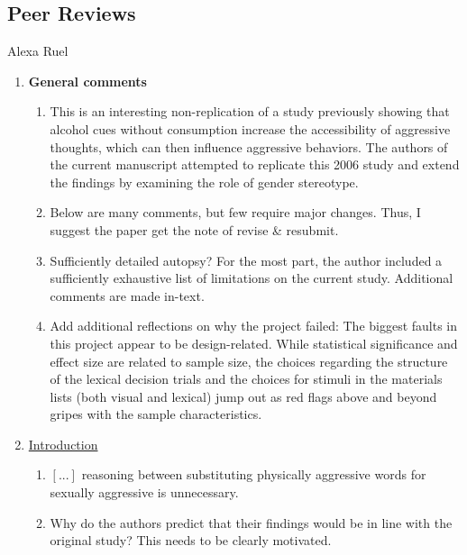\documentclass[authordate, serif, review]{jote-article}
\begin{document}
\begin{multicols}{2}

\newpage

{}
\section*{Peer Reviews}
\label{sec:reviews}

\noindent \begin{reviewend}{ Alexa Ruel}
    \begin{enumerate}[label=\textbf{\arabic*}), start=0]
    \item \textbf{General comments}
        \begin{enumerate}
            \item This is an interesting non-replication of a study previously showing that alcohol cues without consumption increase the accessibility of aggressive thoughts, which can then influence aggressive behaviors. The authors of the current manuscript attempted to replicate this 2006 study and extend the findings by examining the role of gender stereotype.
            \item Below are many comments, but few require major changes. Thus, I suggest the paper get the note of revise \& resubmit.
            \item Sufficiently detailed autopsy? For the most part, the author included a sufficiently exhaustive list of limitations on the current study. Additional comments are made in-text.
            \item Add additional reflections on why the project failed: The biggest faults in this project appear to be design-related. While statistical significance and effect size are related to sample size, the choices regarding the structure of the lexical decision trials and the choices for stimuli in the materials lists (both visual and lexical) jump out as red flags above and beyond gripes with the sample characteristics.
        \end{enumerate}

    \item \hyperref[sec:introduction]{Introduction}
        \begin{enumerate}
            \item $[...]$ reasoning between substituting physically aggressive words for sexually aggressive is unnecessary. 
            \item  Why do the authors predict that their findings would be in line with the original study? This needs to be clearly motivated.
        \end{enumerate}



\end{enumerate}
\end{reviewend}
\end{multicols}
\end{document}
